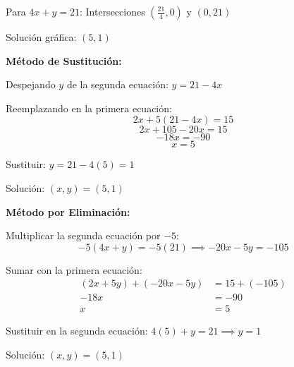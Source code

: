 \begin{exercise}
\begin{solucion}
Para $4x + y = 21$: Intersecciones $(\frac{21}{4}, 0)$ y $(0, 21)$

Solución gráfica: $(5, 1)$

\vspace{0.3cm}

\textbf{Método de Sustitución:}

Despejando $y$ de la segunda ecuación: $y = 21 - 4x$

Reemplazando en la primera ecuación:
$$2x + 5(21 - 4x) = 15$$
$$2x + 105 - 20x = 15$$
$$-18x = -90$$
$$x = 5$$

Sustituir: $y = 21 - 4(5) = 1$

Solución: $(x,y) = (5,1)$

\vspace{0.3cm}

\textbf{Método por Eliminación:}

Multiplicar la segunda ecuación por $-5$:
$$-5(4x + y) = -5(21) \implies -20x - 5y = -105$$

Sumar con la primera ecuación:
$$\begin{aligned}
(2x + 5y) + (-20x - 5y) &= 15 + (-105) \\
-18x &= -90 \\
x &= 5
\end{aligned}$$

Sustituir en la segunda ecuación: $4(5) + y = 21 \implies y = 1$

Solución: $(x,y) = (5,1)$
\end{solucion}
\end{exercise}

